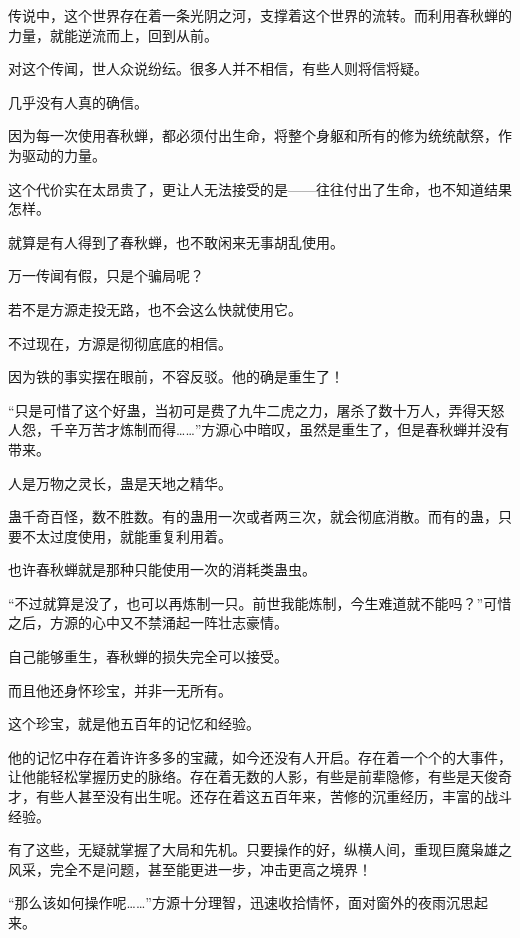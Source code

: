 
\begin{this_body}

传说中，这个世界存在着一条光阴之河，支撑着这个世界的流转。而利用春秋蝉的力量，就能逆流而上，回到从前。

对这个传闻，世人众说纷纭。很多人并不相信，有些人则将信将疑。

几乎没有人真的确信。

因为每一次使用春秋蝉，都必须付出生命，将整个身躯和所有的修为统统献祭，作为驱动的力量。

这个代价实在太昂贵了，更让人无法接受的是——往往付出了生命，也不知道结果怎样。

就算是有人得到了春秋蝉，也不敢闲来无事胡乱使用。

万一传闻有假，只是个骗局呢？

若不是方源走投无路，也不会这么快就使用它。

不过现在，方源是彻彻底底的相信。

因为铁的事实摆在眼前，不容反驳。他的确是重生了！

“只是可惜了这个好蛊，当初可是费了九牛二虎之力，屠杀了数十万人，弄得天怒人怨，千辛万苦才炼制而得……”方源心中暗叹，虽然是重生了，但是春秋蝉并没有带来。

人是万物之灵长，蛊是天地之精华。

蛊千奇百怪，数不胜数。有的蛊用一次或者两三次，就会彻底消散。而有的蛊，只要不太过度使用，就能重复利用着。

也许春秋蝉就是那种只能使用一次的消耗类蛊虫。

“不过就算是没了，也可以再炼制一只。前世我能炼制，今生难道就不能吗？”可惜之后，方源的心中又不禁涌起一阵壮志豪情。

自己能够重生，春秋蝉的损失完全可以接受。

而且他还身怀珍宝，并非一无所有。

这个珍宝，就是他五百年的记忆和经验。

他的记忆中存在着许许多多的宝藏，如今还没有人开启。存在着一个个的大事件，让他能轻松掌握历史的脉络。存在着无数的人影，有些是前辈隐修，有些是天俊奇才，有些人甚至没有出生呢。还存在着这五百年来，苦修的沉重经历，丰富的战斗经验。

有了这些，无疑就掌握了大局和先机。只要操作的好，纵横人间，重现巨魔枭雄之风采，完全不是问题，甚至能更进一步，冲击更高之境界！

“那么该如何操作呢……”方源十分理智，迅速收拾情怀，面对窗外的夜雨沉思起来。


\end{this_body}
